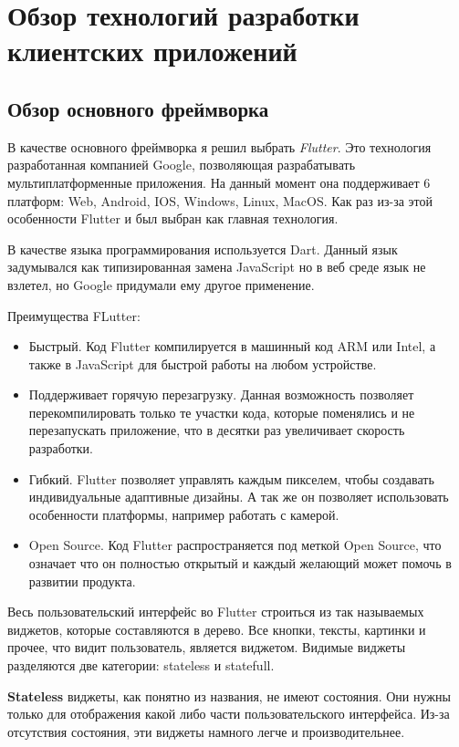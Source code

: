 \section{Обзор технологий разработки клиентских приложений} \label{ch2:sec2}
	

\subsection{Обзор основного фреймворка} \label{ch2:subsec21} 

В качестве основного фреймворка я решил выбрать \textit{Flutter}\cite{flutter}. Это технология разработанная компанией Google, позволяющая разрабатывать мультиплатформенные приложения. На данный момент она поддерживает 6 платформ: Web, Android, IOS, Windows, Linux, MacOS. Как раз из-за этой особенности Flutter и был выбран как главная технология. 

В качестве языка программирования используется Dart. Данный язык задумывался как типизированная замена JavaScript но в веб среде язык не взлетел, но Google придумали ему другое применение. 

Преимущества FLutter:
\begin{itemize}
	\item Быстрый. Код Flutter компилируется в машинный код ARM или Intel, а также в JavaScript для быстрой работы на любом устройстве.
	\item Поддерживает горячую перезагрузку. Данная возможность позволяет перекомпилировать только те участки кода, которые поменялись и не перезапускать приложение, что в десятки раз увеличивает скорость разработки.
	\item Гибкий. Flutter позволяет управлять каждым пикселем, чтобы создавать индивидуальные адаптивные дизайны. А так же он позволяет использовать особенности платформы, например работать с камерой.
	\item Open Source. Код Flutter распространяется под меткой Open Source, что означает что он полностью открытый и каждый желающий может помочь в развитии продукта.

\end{itemize}  

Весь пользовательский интерфейс во Flutter строиться из так называемых виджетов, которые составляются в дерево. Все кнопки, тексты, картинки и прочее, что видит пользователь, является виджетом. Видимые виджеты разделяются две категории: stateless и statefull.

\textbf{Stateless} виджеты, как понятно из названия, не имеют состояния. Они нужны только для отображения какой либо части пользовательского интерфейса. Из-за отсутствия состояния, эти виджеты намного легче и производительнее.

